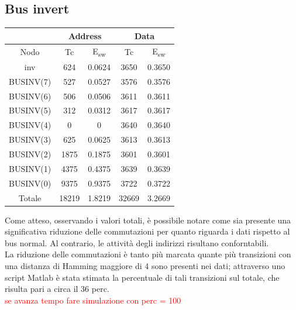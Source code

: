 \documentclass[11pt,  english, makeidx, a4paper, titlepage, oneside]{book}
\begin{document}
\subsection{Bus invert}
\begin{center}
	\begin{tabular}{|c|c|c|c|c|}
	\hline
	& \multicolumn{2}{c}{Address} & \multicolumn{2}{c}{Data}\\
	\hline
	Nodo & Tc & E\textsubscript{sw} & Tc & E\textsubscript{sw} \\
	\hline
	inv & 624 & 0.0624 & 3650 & 0.3650\\
	\hline
	BUSINV(7) & 527 & 0.0527 & 3576 & 0.3576\\
	 \hline
	BUSINV(6) & 506 & 0.0506 & 3611 & 0.3611\\
	\hline
	BUSINV(5) & 312 & 0.0312 & 3617 & 0.3617\\
	\hline
	BUSINV(4) & 0 & 0 & 3640 & 0.3640\\
	\hline
	BUSINV(3) & 625 & 0.0625 & 3613 & 0.3613\\
	\hline
	BUSINV(2) & 1875 & 0.1875 & 3601 & 0.3601\\
	\hline
	BUSINV(1) & 4375 & 0.4375 & 3639 & 0.3639\\
	\hline
	BUSINV(0) & 9375 & 0.9375 & 3722 & 0.3722\\
	\hline
	Totale & 18219 & 1.8219 & 32669 & 3.2669\\
	\hline
	\end{tabular}	
\end{center}
\vspace{0.3cm}
Come atteso, osservando i valori totali, è possibile notare come sia presente una significativa riduzione delle commutazioni per quanto riguarda i dati rispetto al bus normal. Al contrario, le attività degli indirizzi risultano conforntabili.
\\
La riduzione delle commutazioni è tanto più marcata quante più transizioni con una distanza di Hamming maggiore di 4 sono presenti nei dati; attraverso uno script Matlab è stata stimata la percentuale di tali transizioni sul totale, che risulta pari a circa il 36 perc.
\\
\textcolor{red}{se avanza tempo fare simulazione con perc = 100}
\end{document}

